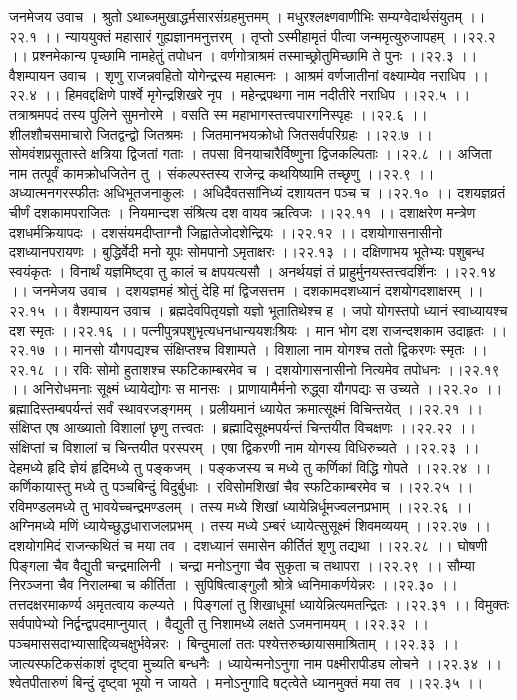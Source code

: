\documentclass[11pt]{book}
\begin{document}
\begin{landscape}
जनमेजय उवाच ।
श्रुतो ऽथाब्जमुखाद्धर्मसारसंग्रहमुत्तमम् ।
मधुरश्लक्ष्णवाणीभिः सम्यग्वेदार्थसंयुतम् ।।२२.१ ।।
न्याययुक्तं महासारं गुह्यज्ञानमनुत्तरम् ।
तृप्तो ऽस्मीहामृतं पीत्वा जन्ममृत्युरुजापहम् ।।२२.२ ।।
प्रश्नमेकान्य पृच्छामि नामहेतुं तपोधन ।
वर्णगोत्राश्रमं तस्माच्छ्रोतुमिच्छामि ते पुनः ।।२२.३ ।।
वैशम्पायन उवाच ।
शृणु राजन्नवहितो योगेन्द्रस्य महात्मनः ।
आश्रमं वर्णजातीनां वक्ष्याम्येव नराधिप ।।२२.४ ।।
हिमवद्दक्षिणे पार्श्वे मृगेन्द्रशिखरे नृप ।
महेन्द्रपथगा नाम नदीतीरे नराधिप ।।२२.५ ।।
तत्राश्रमपदं तस्य पुलिने सुमनोरमे ।
वसति स्म महाभागस्तत्त्वपारगनिस्पृहः ।।२२.६ ।।
शीलशौचसमाचारो जितद्वन्द्वो जितश्रमः ।
जितमानभयक्रोधो जितसर्वपरिग्रहः ।।२२.७ ।।
सोमवंशप्रसूतास्ते क्षत्रिया द्विजतां गताः ।
तपसा विनयाचारैर्विष्णुना द्विजकल्पिताः ।।२२.८ ।।
अजिता नाम तत्पूर्वं कामक्रोधजितेन तु ।
संकल्पस्तस्य राजेन्द्र कथयिष्यामि तच्छृणु ।।२२.९ ।।
अध्यात्मनगरस्फीतः अधिभूतजनाकुलः ।
अधिदैवतसांनिध्यं दशायतन पञ्च च ।।२२.१० ।।
दशयज्ञव्रतं चीर्णं दशकामपराजितः ।
नियमान्दश संश्रित्य दश वायव ऋत्विजः ।।२२.११ ।।
दशाक्षरेण मन्त्रेण दशधर्मक्रियापदः ।
दशसंयमदीप्ताग्नौ जिह्वातेजोदशेन्द्रियः ।।२२.१२ ।।
दशयोगासनासीनो दशध्यानपरायणः ।
बुद्धिर्वेदी मनो यूपः सोमपानो ऽमृताक्षरः ।।२२.१३ ।।
दक्षिणाभय भूतेभ्यः पशुबन्ध स्वयंकृतः ।
विनार्थं यज्ञमिष्ट्वा तु कालं च क्षपयत्यसौ ।
अनर्थयज्ञं तं प्राहुर्मुनयस्तत्त्वदर्शिनः ।।२२.१४ ।।
जनमेजय उवाच ।
दशयज्ञमहं श्रोतुं देहि मां द्विजसत्तम ।
दशकामदशध्यानं दशयोगदशाक्षरम् ।।२२.१५ ।।
वैशम्पायन उवाच ।
ब्रह्मदेवपितृयज्ञो यज्ञो भूतातिथेश्च ह ।
जपो योगस्तपो ध्यानं स्वाध्यायश्च दश स्मृतः ।।२२.१६ ।।
पत्नीपुत्रपशुभृत्यधनधान्ययशःश्रियः ।
मान भोग दश राजन्दशकाम उदाहृतः ।।२२.१७ ।।
मानसो यौगपद्यश्च संक्षिप्तश्च विशाम्पते ।
विशाला नाम योगश्च ततो द्विकरणः स्मृतः ।।२२.१८ ।।
रविः सोमो हुताशश्च स्फटिकाम्बरमेव च ।
दशयोगासनासीनो नित्यमेव तपोधनः ।।२२.१९ ।।
अनिरोधमनाः सूक्ष्मं ध्यायेद्योगः स मानसः ।
प्राणायामैर्मनो रुद्ध्वा यौगपद्यः स उच्यते ।।२२.२० ।।
ब्रह्मादिस्तम्बपर्यन्तं सर्वं स्थावरजङ्गमम् ।
प्रलीयमानं ध्यायेत क्रमात्सूक्ष्मं विचिन्तयेत् ।।२२.२१ ।।
संक्षिप्त एष आख्यातो विशालां छृणु तत्त्वतः ।
ब्रह्मादिसूक्ष्मपर्यन्तं चिन्तयीत विचक्षणः ।।२२.२२ ।।
संक्षिप्तां च विशालां च चिन्तयीत परस्परम् ।
एषा द्विकरणी नाम योगस्य विधिरुच्यते ।।२२.२३ ।।
देहमध्ये हृदि ज्ञेयं हृदिमध्ये तु पङ्कजम् ।
पङ्कजस्य च मध्ये तु कर्णिकां विद्धि गोपते ।।२२.२४ ।।
कर्णिकायास्तु मध्ये तु पञ्चबिन्दुं विदुर्बुधाः ।
रविसोमशिखां चैव स्फटिकाम्बरमेव च ।।२२.२५ ।।
रविमण्डलमध्ये तु भावयेच्चन्द्रमण्डलम् ।
तस्य मध्ये शिखां ध्यायेन्निर्धूमज्वलनप्रभाम् ।।२२.२६ ।।
अग्निमध्ये मणिं ध्यायेच्छुद्धधाराजलप्रभम् ।
तस्य मध्ये ऽम्बरं ध्यायेत्सुसूक्ष्मं शिवमव्ययम् ।।२२.२७ ।।
दशयोगमिदं राजन्कथितं च मया तव ।
दशध्यानं समासेन कीर्तितं शृणु तद्यथा ।।२२.२८ ।।
घोषणी पिङ्गला चैव वैद्युती चन्द्रमालिनी ।
चन्द्रा मनोऽनुगा चैव सुकृता च तथापरा ।।२२.२९ ।।
सौम्या निरञ्जना चैव निरालम्बा च कीर्तिता ।
सुपिषित्वाङ्गुलौ श्रोत्रे ध्वनिमाकर्णयेन्नरः ।।२२.३० ।।
तत्तदक्षरमाकर्ण्य अमृतत्वाय कल्प्यते ।
पिङ्गलां तु शिखाधूमां ध्यायेन्नित्यमतन्द्रितः ।।२२.३१ ।।
विमुक्तः सर्वपापेभ्यो निर्द्वन्द्वपदमाप्नुयात् ।
वैद्युती तु निशामध्ये लक्षते ऽजमनामयम् ।।२२.३२ ।।
पञ्चमाससदाभ्यासाद्दिव्यचक्षुर्भवेन्नरः ।
बिन्दुमालां ततः पश्येत्तरुच्छायासमाश्रिताम् ।।२२.३३ ।।
जात्यस्फटिकसंकाशं दृष्ट्वा मुच्यति बन्धनैः ।
ध्यायेन्मनोऽनुगा नाम पक्ष्मीरापीड्य लोचने ।।२२.३४ ।।
श्वेतपीतारुणं बिन्दुं दृष्ट्वा भूयो न जायते ।
मनोऽनुगादि षट्त्वेते ध्यानमुक्तं मया तव ।।२२.३५ ।।


\end{landscape}
\end{document}

